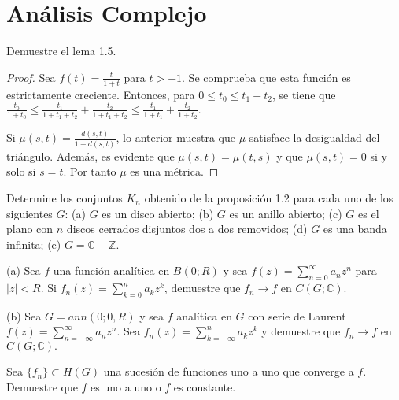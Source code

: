 \documentclass[12pt]{article}
\newcommand{\Z}{\mathbb{Z}}
\newcommand{\C}{\mathbb{C}}
\newenvironment{problem}[2][Problema]{\begin{trivlist}
\item[\hskip \labelsep {\bfseries #1}\hskip \labelsep {\bfseries #2.}]}{\end{trivlist}}
\begin{document}
\section*{Análisis Complejo}

\begin{problem}{1. pp. 150} Demuestre el lema 1.5. 
\end{problem}
\begin{proof}
Sea $f(t) = \frac{t}{1+t}$ para $t > -1.$ Se comprueba que esta función es estrictamente creciente. Entonces, para $0 \leq t_0 \leq t_1 + t_2$, se tiene que $\frac{t_0}{1+t_0}\leq \frac{t_1}{1+t_1 +t_2} + \frac{t_2}{1+t_1+t_2} \leq  \frac{t_1}{1+t_1} + \frac{t_2}{1+t_2}.$

Si $\mu(s, t) = \frac{d(s,t)}{1+ d(s, t)}$, lo anterior muestra que $\mu$ satisface la desigualdad del triángulo. Además, es evidente que $\mu(s,t) = \mu(t,s)$ y que $\mu(s, t) = 0$ si y solo si $s =t.$ Por tanto $\mu$ es una métrica. 
\end{proof}

\begin{problem}{2. pp. 150} Determine los conjuntos $K_n$ obtenido de la proposición 1.2 para cada uno de los siguientes $G$: (a) $G$ es un disco abierto; (b) $G$ es un anillo abierto; (c) $G$ es el plano con $n$ discos cerrados disjuntos dos a dos removidos; (d) $G$ es una banda infinita; (e) $G = \C - \Z.$
\end{problem}

\begin{problem}{8. pp. 151} (a) Sea $f$ una función analítica en $B(0; R)$ y sea $f(z) = \sum_{n=0}^{\infty} a_n z^n$ para $\lvert z \rvert < R$. Si $f_n(z) = \sum_{k=0}^n a_k z^k$, demuestre que $f_n \to f$ en $C(G; \C).$

(b) Sea $G = ann(0; 0, R)$ y sea $f$ analítica en $G$ con serie de Laurent $f(z) = \sum_{n=-\infty}^\infty a_n z^n$. Sea $f_n(z) = \sum_{k=-\infty}^n a_k z^k$ y demuestre que $f_n \to f$ en $C(G; \C).$

\end{problem}

\begin{problem}{10 pp. 154} Sea $\{f_n\} \subset H(G)$ una sucesión de funciones uno a uno que converge a $f$. Demuestre que $f$ es uno a uno o $f$ es constante.
\end{problem}
\end{document}
